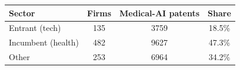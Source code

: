 \begin{tabular}{lccc}
\toprule
Sector & Firms & Medical-AI patents & Share \\
\midrule
Entrant (tech) & 135 & 3759 & 18.5\% \\
Incumbent (health) & 482 & 9627 & 47.3\% \\
Other & 253 & 6964 & 34.2\% \\
\bottomrule
\end{tabular}